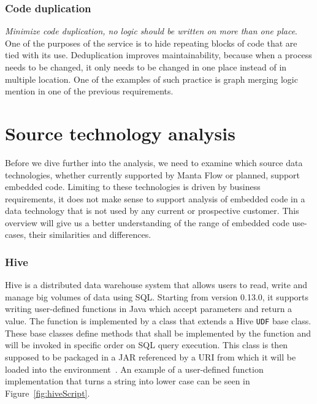 \subsubsection{Code duplication}

\textit{Minimize code duplication, no logic should be written on more than one place}. One of the purposes of the service is to hide repeating blocks of code that are tied with its use. Deduplication improves maintainability, because when a process needs to be changed, it only needs to be changed in one place instead of in multiple location. One of the examples of such practice is graph merging logic mention in one of the previous requirements.

\section{Source technology analysis}
\label{sec:sourceTechnologyAnalysis}

Before we dive further into the analysis, we need to examine which source data technologies, whether currently supported by Manta Flow or planned, support embedded code. Limiting to these technologies is driven by business requirements, it does not make sense to support analysis of embedded code in a data technology that is not used by any current or prospective customer. This overview will give us a better understanding of the range of embedded code use-cases, their similarities and differences.

\subsubsection{Hive}
Hive is a distributed data warehouse system that allows users to read, write and manage big volumes of data using SQL. Starting from version 0.13.0, it supports writing user-defined functions in Java which accept parameters and return a value. The function is implemented by a class that extends a Hive \texttt{UDF} base class. These base classes define methods that shall be implemented by the function and will be invoked in specific order on SQL query execution. This class is then supposed to be packaged in a JAR referenced by a URI from which it will be loaded into the environment~\cite{hive}. An example of a user-defined function implementation that turns a string into lower case can be seen in Figure~\ref{fig:hiveScript}.

